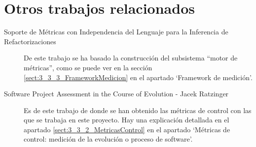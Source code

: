 \section{Otros trabajos relacionados}
\begin{description}
	\item[Soporte de Métricas con Independencia del Lenguaje para la Inferencia de Refactorizaciones] De este trabajo se ha basado la construcción del subsistema ``motor de métricas'', como se puede ver en la sección \ref{sect:3_3_3_FrameworkMedicion} en el apartado `Framework de medición'.
	\item[Software Project Assessment in the Course of Evolution -  Jacek Ratzinger] Es de este trabajo de donde se han obtenido las métricas de control con las que se trabaja en este proyecto. Hay una explicación detallada en el apartado \ref{sect:3_3_2_MetricasControl} en el apartado `Métricas de control: medición de la evolución o proceso de software'.
\end{description}

